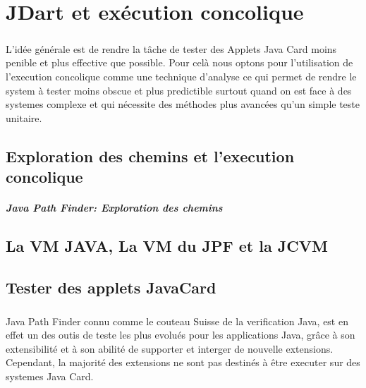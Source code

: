 \chapter{JDart et exécution concolique}
  \paragraph{}
    L'idée générale est de rendre la tâche de tester des Applets Java Card moins penible et plus effective que possible.
    Pour celà nous optons pour l'utilisation de l'execution concolique comme une technique d'analyse ce qui permet de rendre 
    le system à tester moins obscue et plus predictible surtout quand on est face à des systemes complexe
    et qui nécessite des méthodes plus avancées qu'un simple teste unitaire.
  \section{Exploration des chemins et l'execution concolique}
    \paragraph{Java Path Finder: Exploration des chemins}
  \section{La VM JAVA, La VM du JPF et la JCVM}
  \section{Tester des applets JavaCard}
  \paragraph{}
    Java Path Finder connu comme le couteau Suisse de la verification Java,
    est en effet un des outis de teste les plus evolués pour les applications Java,
    grâce à son extensibilité et à son abilité de supporter et interger de nouvelle extensions.
    Cependant, la majorité des extensions ne sont pas destinés à être executer sur des systemes Java Card.